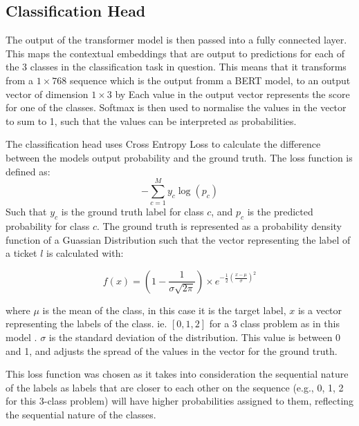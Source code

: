 \documentclass{UoYCSproject}
\begin{document}
    \subsection{Classification Head}\label{subsec:Classification-Head}
    The output of the transformer model is then passed into a fully connected layer.
    This maps the contextual embeddings that are output to predictions for each of the 3 classes in the classification task in question.
    This means that it transforms from a $1\times768$ sequence which is the output fromm a BERT model, to an output vector of dimension $1\times3$ by
    Each value in the output vector represents the score for one of the classes.
    Softmax is then used to normalise the values in the vector to sum to 1, such that the values can be interpreted as probabilities.

    The classification head uses Cross Entropy Loss to calculate the difference between the models output probability and the ground truth.
    The loss function is defined as:
    \[-\sum_{c=1}^My_{c}\log(p_{c})\]
    Such that $y_{c}$ is the ground truth label for class $c$, and $p_{c}$ is the predicted probability for class $c$.
    The ground truth is represented as a probability density function of a Guassian Distribution such that the vector representing the label of a ticket $l$ is calculated with:

    \[f(x) = (1-\frac{1}{\sigma \sqrt {2\pi}}) \times e ^{-\frac{1}{2}(\frac{x-\mu }{\sigma})^{2}}\]

    where $\mu$ is the mean of the class, in this case it is the target label, $x$ is a vector representing the labels of the class. ie. $[0,1,2]$ for a 3 class problem as in this model .
    $\sigma$ is the standard deviation of the distribution.
    This value is between 0 and 1, and adjusts the spread of the values in the vector for the ground truth.

    This loss function was chosen as it takes into consideration the sequential nature of the labels as labels that are closer to each other on the sequence (e.g., 0, 1, 2 for this 3-class problem) will have higher probabilities assigned to them, reflecting the sequential nature of the classes.
\end{document}
